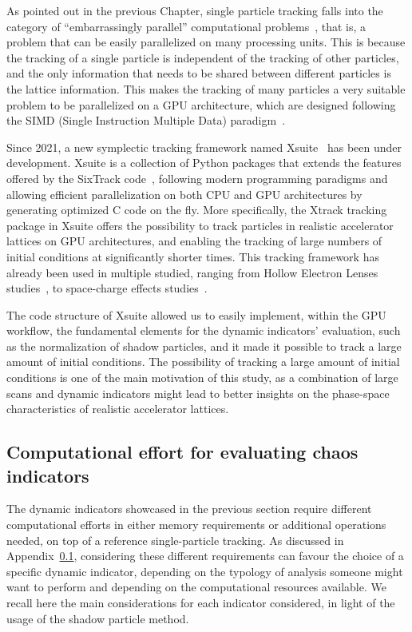 As pointed out in the previous Chapter, single particle tracking falls into the category of ``embarrassingly parallel'' computational problems~\cite{}, that is, a problem that can be easily parallelized on many processing units. This is because the tracking of a single particle is independent of the tracking of other particles, and the only information that needs to be shared between different particles is the lattice information. This makes the tracking of many particles a very suitable problem to be parallelized on a GPU architecture, which are designed following the SIMD (Single Instruction Multiple Data) paradigm~\cite{}.

Since 2021, a new symplectic tracking framework named Xsuite~\cite{xsuite} has been under development. Xsuite is a collection of Python packages that extends the features offered by the SixTrack code~\cite{De_Maria_2019}, following modern programming paradigms and allowing efficient parallelization on both CPU and GPU architectures by generating optimized C code on the fly. More specifically, the Xtrack tracking package in Xsuite offers the possibility to track particles in realistic accelerator lattices on GPU architectures, and enabling the tracking of large numbers of initial conditions at significantly shorter times. This tracking framework has already been used in multiple studied, ranging from Hollow Electron Lenses studies~\cite{}, to space-charge effects studies~\cite{}.

The code structure of Xsuite allowed us to easily implement, within the GPU workflow, the fundamental elements for the dynamic indicators' evaluation, such as the normalization of shadow particles, and it made it possible to track a large amount of initial conditions. The possibility of tracking a large amount of initial conditions is one of the main motivation of this study, as a combination of large scans and dynamic indicators might lead to better insights on the phase-space characteristics of realistic accelerator lattices.
%
\subsection{Computational effort for evaluating chaos indicators}

The dynamic indicators showcased in the previous section require different computational efforts in either memory requirements or additional operations needed, on top of a reference single-particle tracking. As discussed in Appendix~\ref{}, considering these different requirements can favour the choice of a specific dynamic indicator, depending on the typology of analysis someone might want to perform and depending on the computational resources available. We recall here the main considerations for each indicator considered, in light of the usage of the shadow particle method.

